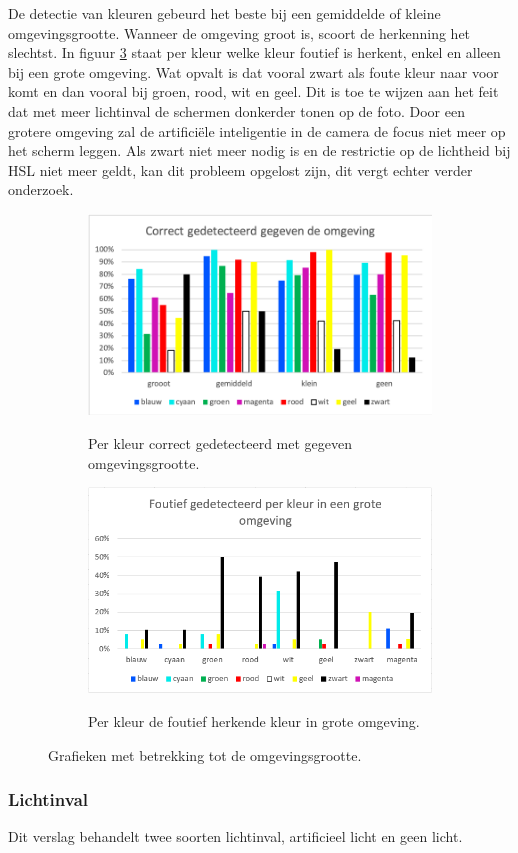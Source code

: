 De detectie van kleuren gebeurd het beste bij een gemiddelde of kleine omgevingsgrootte. Wanneer de omgeving groot is, scoort de herkenning het slechtst. In figuur \ref{fig:groteOmgevingFoutHerkent} staat per kleur welke kleur foutief is herkent, enkel en alleen bij een grote omgeving. Wat opvalt is dat vooral zwart als foute kleur naar voor komt en dan vooral bij groen, rood, wit en geel. Dit is toe te wijzen aan het feit dat met meer lichtinval de schermen donkerder tonen op de foto. Door een grotere omgeving zal de artificiële inteligentie in de camera de focus niet meer op het scherm leggen. Als zwart niet meer nodig is en de restrictie op de lichtheid bij HSL niet meer geldt, kan dit probleem opgelost zijn, dit vergt echter verder onderzoek.
\begin{figure}
	\begin{subfigure}{0.5\textwidth}
	\centering
	\includegraphics{img/Environment}
	\label{fig:omgeving}
	\caption{Per kleur correct gedetecteerd met gegeven omgevingsgrootte.}
	\end{subfigure}
	
	\begin{subfigure}{0.5\textwidth}
	\centering
	\includegraphics{img/BigEnvPerColor}
	\label{fig:groteOmgevingFoutHerkent}
	\caption{Per kleur de foutief herkende kleur in grote omgeving.}
	\end{subfigure}
	\caption{Grafieken met betrekking tot de omgevingsgrootte.}
\end{figure}

\subsubsection{Lichtinval}
Dit verslag behandelt twee soorten lichtinval, artificieel licht en geen licht.